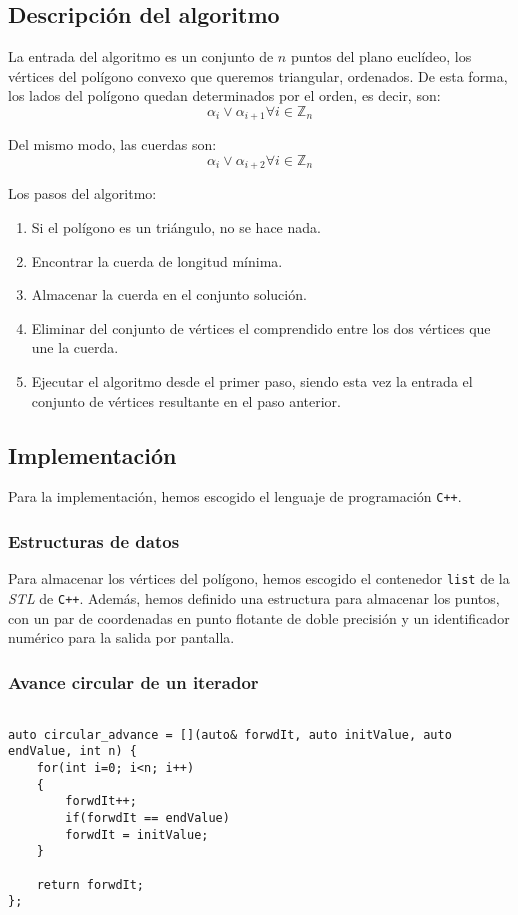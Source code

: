 \documentclass[a4paper, 11pt]{article}
\begin{document}
\subsection{Descripción del algoritmo}
La entrada del algoritmo es un conjunto de $n$ puntos del plano euclídeo, los vértices del polígono convexo que queremos triangular, ordenados. De esta forma, los lados del polígono quedan determinados por el orden, es decir, son: 
\[\alpha_i \vee \alpha_{i+1} \forall i\in \mathbb{Z}_n\]

Del mismo modo, las cuerdas son:
\[\alpha_i \vee \alpha_{i+2} \forall i\in \mathbb{Z}_n\]

Los pasos del algoritmo:

\begin{enumerate}
    \item Si el polígono es un triángulo, no se hace nada.
	\item Encontrar la cuerda de longitud mínima.
	\item Almacenar la cuerda en el conjunto solución.
	\item Eliminar del conjunto de vértices el comprendido entre los dos vértices que une la cuerda.
	\item Ejecutar el algoritmo desde el primer paso, siendo esta vez la entrada el conjunto de vértices resultante en el paso anterior.
\end{enumerate}

\subsection{Implementación}
Para la implementación, hemos escogido el lenguaje de programación \texttt{C++}.

\subsubsection{Estructuras de datos}
Para almacenar los vértices del polígono, hemos escogido el contenedor \texttt{list} de la \textit{STL} de \texttt{C++}. Además, hemos definido una estructura para almacenar los puntos, con un par de coordenadas en punto flotante de doble precisión y un identificador numérico para la salida por pantalla.

\subsubsection{Avance circular de un iterador}
\begin{lstlisting}

auto circular_advance = [](auto& forwdIt, auto initValue, auto endValue, int n) {
	for(int i=0; i<n; i++)
	{
		forwdIt++;
		if(forwdIt == endValue)
		forwdIt = initValue;
	}

	return forwdIt;
};
\end{lstlisting}
\end{document}
